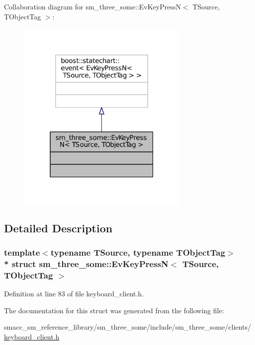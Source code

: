 Collaboration diagram for sm\+\_\+three\+\_\+some\+:\+:Ev\+Key\+PressN$<$ T\+Source, T\+Object\+Tag $>$\+:
\nopagebreak
\begin{figure}[H]
\begin{center}
\leavevmode
\includegraphics[width=235pt]{structsm__three__some_1_1EvKeyPressN__coll__graph}
\end{center}
\end{figure}


\subsection{Detailed Description}
\subsubsection*{template$<$typename T\+Source, typename T\+Object\+Tag$>$\\*
struct sm\+\_\+three\+\_\+some\+::\+Ev\+Key\+Press\+N$<$ T\+Source, T\+Object\+Tag $>$}



Definition at line 83 of file keyboard\+\_\+client.\+h.



The documentation for this struct was generated from the following file\+:\begin{DoxyCompactItemize}
\item 
smacc\+\_\+sm\+\_\+reference\+\_\+library/sm\+\_\+three\+\_\+some/include/sm\+\_\+three\+\_\+some/clients/\hyperlink{keyboard__client_8h}{keyboard\+\_\+client.\+h}\end{DoxyCompactItemize}
